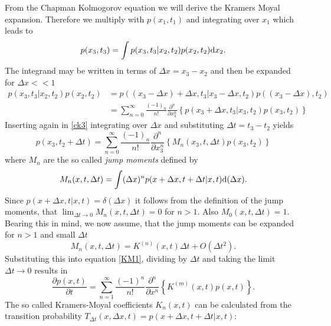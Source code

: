 From the Chapman Kolmogorov equation we will derive the Kramers Moyal expansion. Therefore we multiply  with $p(x_1,t_1)$ and integrating over $x_1$ which leads to
\begin{equation}
    p(x_3,t_3) = \int p(x_3,t_3|x_2,t_2)p(x_2,t_2) {\rm d} x_2.
    \label{ck3}
\end{equation}
The integrand may be written in terms of $\Delta x = x_3 - x_2$ and then be expanded for $\Delta x << 1$
\begin{align}
    p(x_3,t_3|x_2,t_2)p(x_2,t_2) &= p( (x_3 - \Delta x) + \Delta x, t_3|x_3 - \Delta x, t_2)p( (x_3 - \Delta x), t_2) \nonumber \\
    &= \sum_{n=0}^{\infty} \frac{(-1)_{n}}{n!}\frac{\partial^{n}}{\partial x_3^{n}}\left\{p(x_3 + \Delta x, t_3|x_3,t_2) p(x_3,t_2)\right\}
\end{align}
Inserting again in \eqref{ck3} integrating over $\Delta x$ and substituting $\Delta t = t_3 - t_2$ yields
\begin{equation}
    p(x_3,t_2 + \Delta t) = \sum_{n=0}^{\infty} \frac{(-1)_{n}}{n!}\frac{\partial^{n}}{\partial x_3^{n}}\left\{ M_{n}(x_3,t,\Delta t) p(x_3,t_2) \right\}
    \label{KM1}
\end{equation}
where $M_n$ are the so called \textit{jump moments} defined by
\begin{equation}
    M_n(x,t,\Delta t) = \int (\Delta x)^{n} p(x + \Delta x, t + \Delta t | x, t) {\rm d} (\Delta x).
    \label{Jump_moments}
\end{equation}
Since $p(x+\Delta x, t|x,t) = \delta (\Delta x)$ it follows from the definition of the jump moments, that $\lim_{\Delta t \rightarrow 0} M_{n}(x,t,\Delta t) = 0$ for $n > 1$. Also $M_{0}(x,t,\Delta t) = 1$. Bearing this in mind, we now assume, that the jump moments can be expanded for $n > 1$ and small $\Delta t$
\begin{equation}
    M_{n}(x,t,\Delta t) = K^{(n)}(x,t)\Delta t + O(\Delta t^{2}).
\end{equation}
Substituting this into equation \eqref{KM1}, dividing by $\Delta t$ and taking the limit $\Delta t \rightarrow 0$ results in 
\begin{equation}
    \frac{\partial p(x,t)}{\partial t} = \sum_{n = 1}^{\infty}\frac{(-1)^{n}}{n!}\frac{\partial^n}{\partial x^n} \left\{ K^{(m)}(x,t) p(x,t) \right\}.
    \label{Kramers Moyal expansion}
\end{equation}
The so called Kramers-Moyal coefficients $K_{n}(x,t)$ can be calculated from the transition probability $T_{\Delta t}(x,\Delta x,t) = p(x+\Delta x,t+\Delta t | x, t)$:
